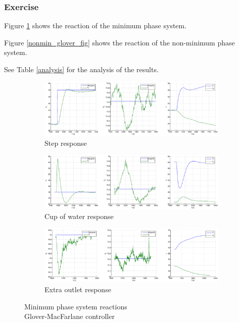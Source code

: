 \subsubsection{Exercise} 


Figure \ref{min_glover_fig} shows the reaction of the minimum phase system. 

Figure \ref{nonmin_glover_fig} shows the reaction of the non-minimum phase system. 

See Table \ref{analysis} for the analysis of the results. 

\begin{figure}[h!t]
        \centering
        \begin{subfigure}[b]{\columnwidth}
                \includegraphics[width=\columnwidth]{fig/min_glover_step.eps}
                \caption{Step response}
        \end{subfigure}
        \begin{subfigure}[b]{\columnwidth}
                \includegraphics[width=\columnwidth]{fig/min_glover_gob.eps}
                \caption{Cup of water response}
        \end{subfigure}
        \begin{subfigure}[b]{\columnwidth}
                \includegraphics[width=\columnwidth]{fig/min_glover_fui.eps}
                \caption{Extra outlet response}
        \end{subfigure}
        \caption{Minimum phase system reactions \\ Glover-MacFarlane controller}
        \label{min_glover_fig}
\end{figure}

